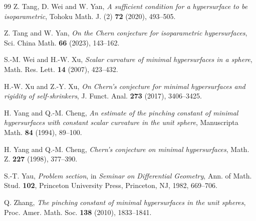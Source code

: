 \documentclass[11pt,reqno]{amsart}
\numberwithin{equation}{section}
\begin{document}
\begin{thebibliography}{99}
Z. Tang, D. Wei and W. Yan,
\emph{A sufficient condition for a hypersurface to be isoparametric},
Tohoku Math. J. (2) \textbf{72} (2020), 493--505.

Z. Tang and W. Yan,
\emph{On the Chern conjecture for isoparametric hypersurfaces},
Sci. China Math. \textbf{66} (2023), 143--162.

S.-M. Wei and H.-W. Xu,
\emph{Scalar curvature of minimal hypersurfaces in a sphere},
Math. Res. Lett. \textbf{14} (2007), 423--432.

H.-W. Xu and Z.-Y. Xu,
\emph{On Chern's conjecture for minimal hypersurfaces and rigidity of self-shrinkers},
J. Funct. Anal. \textbf{273} (2017), 3406--3425.

H. Yang and Q.-M. Cheng,
\emph{An estimate of the pinching constant of minimal hypersurfaces with constant scalar curvature in the unit sphere},
Manuscripta Math. \textbf{84} (1994), 89--100.

H. Yang and Q.-M. Cheng,
\emph{Chern's conjecture on minimal hypersurfaces},
Math. Z. \textbf{227} (1998), 377--390.

S.-T. Yau,
\emph{Problem section},
in \emph{Seminar on Differential Geometry}, Ann. of Math. Stud. \textbf{102},
Princeton University Press, Princeton, NJ, 1982, 669--706.

Q. Zhang,
\emph{The pinching constant of minimal hypersurfaces in the unit spheres},
Proc. Amer. Math. Soc. \textbf{138} (2010), 1833--1841.



\end{thebibliography}
\end{document}
